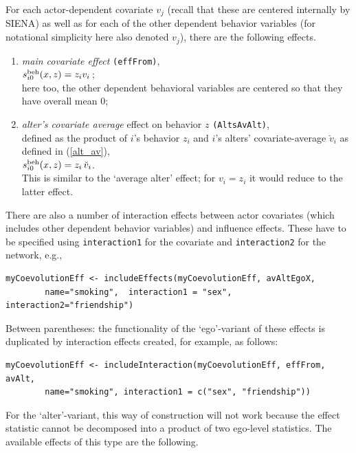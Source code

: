 \documentclass[a4paper,fleqn,11pt]{article}
\newcommand{\+}{\, + \,}
\newcommand{\vit}{\theenumi}
\newcommand{\si}{{\sf SIENA}}
\newcounter{savenumi}
\begin{document}
\noindent
For each actor-dependent covariate $v_j$ (recall that these are
centered internally by \si) as well as for each of the other
dependent behavior variables (for notational simplicity here also
denoted $v_j$), there are the following effects.
\begin{enumerate}
\setcounter{enumi}{\value{savenumi}}
 \item {\em main covariate effect} \texttt{(effFrom)},\\
 $s^{\rm beh}_{i\vit}(x, z) = z_{i} v_{i}\,$;\\
 here too, the other dependent behavioral variables are centered so that they
 have overall mean 0;
\item \emph{alter's covariate average } effect on behavior $z$
 \texttt{(AltsAvAlt)},\\
      defined as the product of $i$'s behavior $z_i$ and
      $i$'s alters' covariate-average $\breve v_i$ as defined
      in (\ref{alt_av}),\\
       $s^{\rm beh}_{i\vit}(x, z) = z_i \, \breve v_i $.\\
      This is similar to the `average alter' effect; for
      $v_i = z_i$ it would reduce to the latter effect.
\setcounter{savenumi}{\value{enumi}}
\end{enumerate}
There are also a number of interaction effects between actor covariates
(which includes other dependent behavior variables) and influence effects.
These have to be specified using \texttt{interaction1} for the covariate
and \texttt{interaction2} for the network, e.g.,
\begin{verbatim}
myCoevolutionEff <- includeEffects(myCoevolutionEff, avAltEgoX,
        name="smoking",  interaction1 = "sex", interaction2="friendship")
\end{verbatim}
Between parentheses: the functionality of the `ego'-variant of these effects is duplicated by
interaction effects created, for example, as follows:
\begin{verbatim}
myCoevolutionEff <- includeInteraction(myCoevolutionEff, effFrom, avAlt,
        name="smoking", interaction1 = c("sex", "friendship"))
\end{verbatim}
For the `alter'-variant, this way of construction will not work because the
effect statistic cannot be decomposed into a product of two ego-level statistics.
The available effects of this type are the following.
\end{document}
